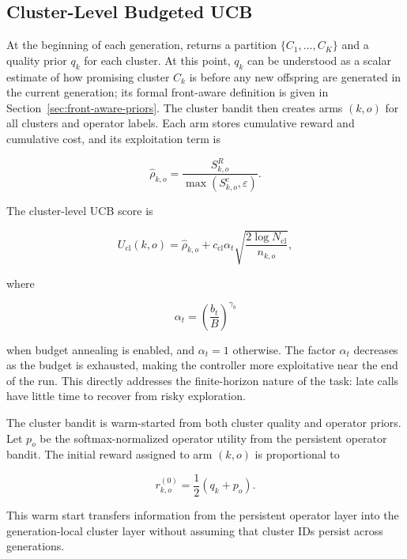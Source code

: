 \documentclass[../main.tex]{subfiles}
\begin{document}
\subsection{Cluster-Level Budgeted UCB}

At the beginning of each generation,  returns a partition $\{C_1,\ldots,C_K\}$ and a quality prior $q_k$ for each cluster. At this point, $q_k$ can be understood as a scalar estimate of how promising cluster $C_k$ is before any new offspring are generated in the current generation; its formal front-aware definition is given in Section~\ref{sec:front-aware-priors}. The cluster bandit then creates arms $(k,o)$ for all clusters and operator labels. Each arm stores cumulative reward and cumulative cost, and its exploitation term is

\begin{equation}
  \hat{\rho}_{k,o}
  =
  \frac{S_{k,o}^R}{\max(S_{k,o}^c,\varepsilon)}.
\end{equation}

The cluster-level UCB score is

\begin{equation}
  U_{\mathrm{cl}}(k,o)
  =
  \hat{\rho}_{k,o}
  +
  c_{\mathrm{cl}}
  \alpha_t
  \sqrt{\frac{2\log N_{\mathrm{cl}}}{n_{k,o}}},
  \label{eq:cluster-ucb}
\end{equation}

where

\begin{equation}
  \alpha_t =
  \left(\frac{b_t}{B}\right)^{\gamma_b}
\end{equation}

when budget annealing is enabled, and $\alpha_t=1$ otherwise. The factor $\alpha_t$ decreases as the budget is exhausted, making the controller more exploitative near the end of the run. This directly addresses the finite-horizon nature of the task: late calls have little time to recover from risky exploration.

The cluster bandit is warm-started from both cluster quality and operator priors. Let $p_o$ be the softmax-normalized operator utility from the persistent operator bandit. The initial reward assigned to arm $(k,o)$ is proportional to

\begin{equation}
  r^{(0)}_{k,o} = \frac{1}{2}\left(q_k+p_o\right).
\end{equation}

This warm start transfers information from the persistent operator layer into the generation-local cluster layer without assuming that cluster IDs persist across generations.
\end{document}
